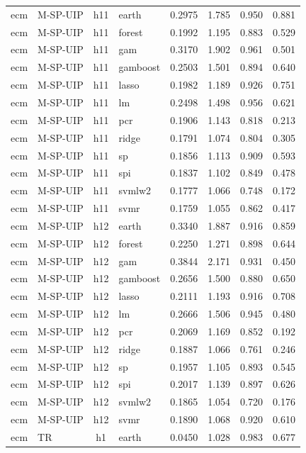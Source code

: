 \begin{ThreePartTable}
\begin{longtable}[t]{llclcccc}
ecm & M-SP-UIP & h11 & earth & 0.2975 & 1.785 & 0.950 & 0.881\\
ecm & M-SP-UIP & h11 & forest & 0.1992 & 1.195 & 0.883 & 0.529\\
ecm & M-SP-UIP & h11 & gam & 0.3170 & 1.902 & 0.961 & 0.501\\
ecm & M-SP-UIP & h11 & gamboost & 0.2503 & 1.501 & 0.894 & 0.640\\
ecm & M-SP-UIP & h11 & lasso & 0.1982 & 1.189 & 0.926 & 0.751\\
ecm & M-SP-UIP & h11 & lm & 0.2498 & 1.498 & 0.956 & 0.621\\
ecm & M-SP-UIP & h11 & pcr & 0.1906 & 1.143 & 0.818 & 0.213\\
ecm & M-SP-UIP & h11 & ridge & 0.1791 & 1.074 & 0.804 & 0.305\\
ecm & M-SP-UIP & h11 & sp & 0.1856 & 1.113 & 0.909 & 0.593\\
ecm & M-SP-UIP & h11 & spi & 0.1837 & 1.102 & 0.849 & 0.478\\
ecm & M-SP-UIP & h11 & svmlw2 & 0.1777 & 1.066 & 0.748 & 0.172\\
ecm & M-SP-UIP & h11 & svmr & 0.1759 & 1.055 & 0.862 & 0.417\\
\addlinespace
ecm & M-SP-UIP & h12 & earth & 0.3340 & 1.887 & 0.916 & 0.859\\
ecm & M-SP-UIP & h12 & forest & 0.2250 & 1.271 & 0.898 & 0.644\\
ecm & M-SP-UIP & h12 & gam & 0.3844 & 2.171 & 0.931 & 0.450\\
ecm & M-SP-UIP & h12 & gamboost & 0.2656 & 1.500 & 0.880 & 0.650\\
ecm & M-SP-UIP & h12 & lasso & 0.2111 & 1.193 & 0.916 & 0.708\\
ecm & M-SP-UIP & h12 & lm & 0.2666 & 1.506 & 0.945 & 0.480\\
ecm & M-SP-UIP & h12 & pcr & 0.2069 & 1.169 & 0.852 & 0.192\\
ecm & M-SP-UIP & h12 & ridge & 0.1887 & 1.066 & 0.761 & 0.246\\
ecm & M-SP-UIP & h12 & sp & 0.1957 & 1.105 & 0.893 & 0.545\\
ecm & M-SP-UIP & h12 & spi & 0.2017 & 1.139 & 0.897 & 0.626\\
ecm & M-SP-UIP & h12 & svmlw2 & 0.1865 & 1.054 & 0.720 & 0.176\\
ecm & M-SP-UIP & h12 & svmr & 0.1890 & 1.068 & 0.920 & 0.610\\
\addlinespace
ecm & TR & h1 & earth & 0.0450 & 1.028 & 0.983 & 0.677\\

\end{longtable}
\end{ThreePartTable}
